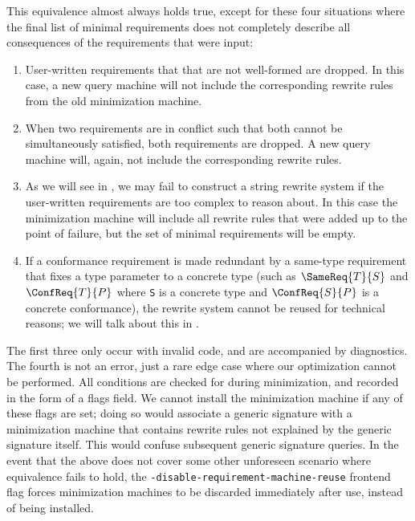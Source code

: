 \documentclass[../generics]{subfiles}
\begin{document}
This equivalence almost always holds true, except for these four situations where the final list of minimal requirements does not completely describe all consequences of the requirements that were input:
\begin{enumerate}
\item User-written requirements that that are not well-formed are dropped. In this case, a new query machine will not include the corresponding rewrite rules from the old minimization machine.

\item When two requirements are in conflict such that both cannot be simultaneously satisfied, both requirements are dropped. A new query machine will, again, not include the corresponding rewrite rules.

\item As we will see in , we may fail to construct a string rewrite system if the user-written requirements are too complex to reason about. In this case the minimization machine will include all rewrite rules that were added up to the point of failure, but the set of minimal requirements will be empty.

\item If a conformance requirement is made redundant by a same-type requirement that fixes a type parameter to a concrete type (such as $\SameReq{T}{S}$ and $\ConfReq{T}{P}$ where \texttt{S} is a concrete type and $\ConfReq{S}{P}$ is a concrete conformance), the rewrite system cannot be reused for technical reasons; we will talk about this in .
\end{enumerate}

The first three only occur with invalid code, and are accompanied by diagnostics. The fourth is not an error, just a rare edge case where our optimization cannot be performed. All conditions are checked for during minimization, and recorded in the form of a flags field. We cannot install the minimization machine if any of these flags are set; doing so would associate a generic signature with a minimization machine that contains rewrite rules not explained by the generic signature itself. This would confuse subsequent generic signature queries. In the event that the above does not cover some other unforeseen scenario where equivalence fails to hold, the \texttt{-disable-requirement-machine-reuse} frontend flag forces minimization machines to be discarded immediately after use, instead of being installed.
\end{document}
